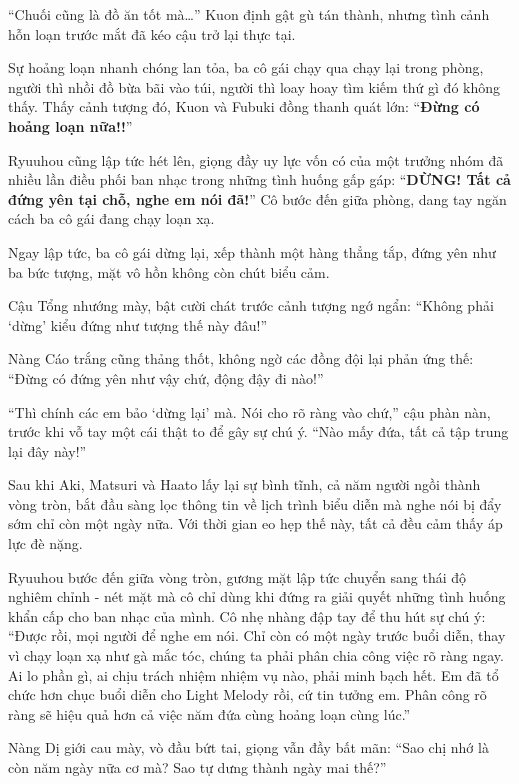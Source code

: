 \documentclass[../main.tex]{subfiles}
\begin{document}
``Chuối cũng là đồ ăn tốt mà\dots'' Kuon định gật gù tán thành, nhưng tình cảnh hỗn loạn trước mắt đã kéo cậu trở lại thực tại.

Sự hoảng loạn nhanh chóng lan tỏa, ba cô gái chạy qua chạy lại trong phòng, người thì nhồi đồ bừa bãi vào túi, người thì loay hoay tìm kiếm thứ gì đó không thấy. Thấy cảnh tượng đó, Kuon và Fubuki đồng thanh quát lớn: ``\textbf{Đừng có hoảng loạn nữa!!}''

Ryuuhou cũng lập tức hét lên, giọng đầy uy lực vốn có của một trưởng nhóm đã nhiều lần điều phối ban nhạc trong những tình huống gấp gáp: ``\textbf{DỪNG! Tất cả đứng yên tại chỗ, nghe em nói đã!}'' Cô bước đến giữa phòng, dang tay ngăn cách ba cô gái đang chạy loạn xạ.

Ngay lập tức, ba cô gái dừng lại, xếp thành một hàng thẳng tắp, đứng yên như ba bức tượng, mặt vô hồn không còn chút biểu cảm.


Cậu Tổng nhướng mày, bật cười chát trước cảnh tượng ngớ ngẩn: ``Không phải `dừng' kiểu đứng như tượng thế này đâu!''

Nàng Cáo trắng cũng thảng thốt, không ngờ các đồng đội lại phản ứng thế: ``Đừng có đứng yên như vậy chứ, động đậy đi nào!''

``Thì chính các em bảo `dừng lại' mà. Nói cho rõ ràng vào chứ,'' cậu phàn nàn, trước khi vỗ tay một cái thật to để gây sự chú ý. ``Nào mấy đứa, tất cả tập trung lại đây này!''

\ct

Sau khi Aki, Matsuri và Haato lấy lại sự bình tĩnh, cả năm người ngồi thành vòng tròn, bắt đầu sàng lọc thông tin về lịch trình biểu diễn mà nghe nói bị đẩy sớm chỉ còn một ngày nữa. Với thời gian eo hẹp thế này, tất cả đều cảm thấy áp lực đè nặng.

Ryuuhou bước đến giữa vòng tròn, gương mặt lập tức chuyển sang thái độ nghiêm chỉnh - nét mặt mà cô chỉ dùng khi đứng ra giải quyết những tình huống khẩn cấp cho ban nhạc của mình. Cô nhẹ nhàng đập tay để thu hút sự chú ý: ``Được rồi, mọi người để nghe em nói. Chỉ còn có một ngày trước buổi diễn, thay vì chạy loạn xạ như gà mắc tóc, chúng ta phải phân chia công việc rõ ràng ngay. Ai lo phần gì, ai chịu trách nhiệm nhiệm vụ nào, phải minh bạch hết. Em đã tổ chức hơn chục buổi diễn cho Light Melody rồi, cứ tin tưởng em. Phân công rõ ràng sẽ hiệu quả hơn cả việc năm đứa cùng hoảng loạn cùng lúc.''

Nàng Dị giới cau mày, vò đầu bứt tai, giọng vẫn đầy bất mãn: ``Sao chị nhớ là còn năm ngày nữa cơ mà? Sao tự dưng thành ngày mai thế?''
\end{document}
